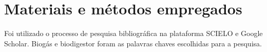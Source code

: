 \chapter{Materiais e métodos empregados}

Foi utilizado o processo de pesquisa bibliográfica na plataforma SCIELO e Google Scholar. Biogás e biodigestor foram as palavras chaves escolhidas para a pesquisa.